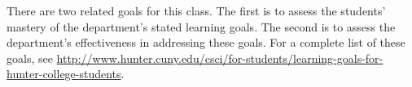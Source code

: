 
There are two related goals for this class. The first is to assess the students’ mastery of the department’s stated learning goals. The second is to assess the department’s effectiveness in addressing these goals. For a complete list of these goals, see \href{http://www.hunter.cuny.edu/csci/for-students/learning-goals-for-hunter-college-students}{http://www.hunter.cuny.edu/csci/for-students/learning-goals-for-hunter-college-students}.


